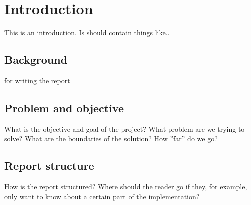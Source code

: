 \chapter{Introduction}
This is an introduction. Is should contain things like..

\section{Background}
for writing the report 

\section{Problem and objective}
What is the objective and goal of the project? What problem are we trying to solve? What are the boundaries of the solution? How ''far'' do we go?

\section{Report structure}
How is the report structured? Where should the reader go if they, for example, only want to know about a certain part of the implementation?
